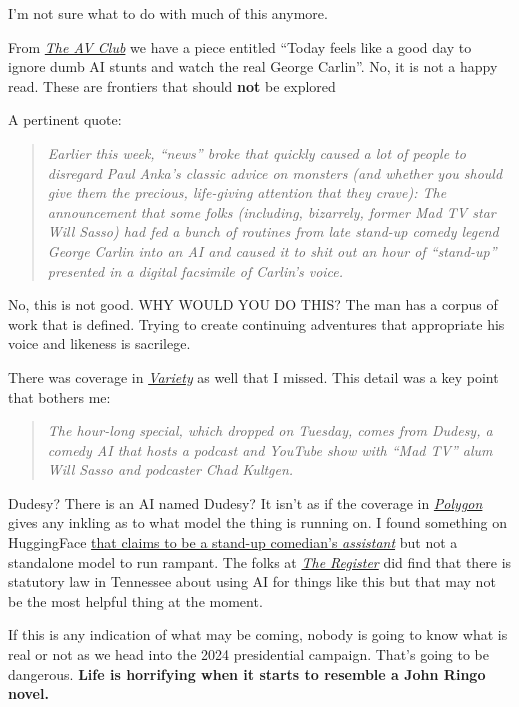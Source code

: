 I'm not sure what to do with much of this anymore.

From
\href{https://www.avclub.com/george-carlin-ai-stunt-cant-compare-to-the-real-thing-1851161376}{\emph{The
AV Club}} we have a piece entitled ``Today feels like a good day to
ignore dumb AI stunts and watch the real George Carlin''. No, it is not
a happy read. These are frontiers that should \textbf{not} be explored

A pertinent quote:

\begin{quote}
\emph{Earlier this week, ``news'' broke that quickly caused a lot of
people to disregard Paul Anka's classic advice on monsters (and whether
you should give them the precious, life-giving attention that they
crave): The announcement that some folks (including, bizarrely, former
Mad TV star Will Sasso) had fed a bunch of routines from late stand-up
comedy legend George Carlin into an AI and caused it to shit out an hour
of ``stand-up'' presented in a digital facsimile of Carlin's voice.}
\end{quote}

No, this is not good. WHY WOULD YOU DO THIS? The man has a corpus of
work that is defined. Trying to create continuing adventures that
appropriate his voice and likeness is sacrilege.

There was coverage in
\href{https://variety.com/2024/digital/news/george-carlin-ai-generated-comedy-special-1235868315/}{\emph{Variety}}
as well that I missed. This detail was a key point that bothers me:

\begin{quote}
\emph{The hour-long special, which dropped on Tuesday, comes from
Dudesy, a comedy AI that hosts a podcast and YouTube show with ``Mad
TV'' alum Will Sasso and podcaster Chad Kultgen.}
\end{quote}

Dudesy? There is an AI named Dudesy? It isn't as if the coverage in
\href{https://www.polygon.com/24034625/george-carlin-i-wish-i-was-dead-ai-comedy-special-kelly-carlin-dudesy}{\emph{Polygon}}
gives any inkling as to what model the thing is running on. I found
something on HuggingFace
\href{https://huggingface.co/njwrigh92/t-5-comedy}{that claims to be a
stand-up comedian's \emph{assistant}} but not a standalone model to run
rampant. The folks at
\href{https://www.theregister.com/2024/01/12/george_carlin_comedian_cloned/}{\emph{The
Register}} did find that there is statutory law in Tennessee about using
AI for things like this but that may not be the most helpful thing at
the moment.

If this is any indication of what may be coming, nobody is going to know
what is real or not as we head into the 2024 presidential campaign.
That's going to be dangerous. \textbf{Life is horrifying when it starts
to resemble a John Ringo novel.}
